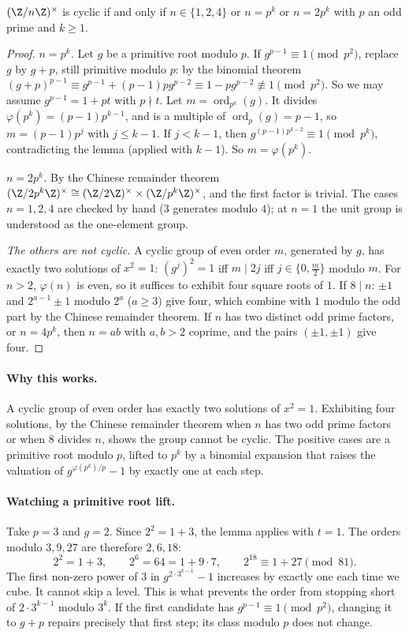 \begin{theorem}\label{thm:cyclicn}
$(\Z/n\Z)^\times$ is cyclic if and only if $n\in\{1,2,4\}$ or $n=p^k$ or $n=2p^k$ with $p$ an odd prime and $k\ge1$.
\end{theorem}
\begin{proof}
\emph{$n=p^k$.} Let $g$ be a primitive root modulo $p$. If $g^{p-1}\equiv1\pmod{p^2}$, replace $g$ by $g+p$, still primitive modulo $p$: by the binomial theorem $(g+p)^{p-1}\equiv g^{p-1}+(p-1)pg^{p-2}\equiv1-pg^{p-2}\not\equiv1\pmod{p^2}$. So we may assume $g^{p-1}=1+pt$ with $p\nmid t$. Let $m=\operatorname{ord}_{p^k}(g)$. It divides $\varphi(p^k)=(p-1)p^{k-1}$, and is a multiple of $\operatorname{ord}_p(g)=p-1$, so $m=(p-1)p^j$ with $j\le k-1$. If $j<k-1$, then $g^{(p-1)p^{k-2}}\equiv1\pmod{p^k}$, contradicting the lemma (applied with $k-1$). So $m=\varphi(p^k)$.

\emph{$n=2p^k$.} By the Chinese remainder theorem $(\Z/2p^k\Z)^\times\cong(\Z/2\Z)^\times\times(\Z/p^k\Z)^\times$, and the first factor is trivial. The cases $n=1,2,4$ are checked by hand ($3$ generates modulo $4$); at $n=1$ the unit group is understood as the one-element group.

\emph{The others are not cyclic.} A cyclic group of even order $m$, generated by $g$, has exactly two solutions of $x^2=1$: $(g^j)^2=1$ iff $m\mid2j$ iff $j\in\{0,\frac m2\}$ modulo $m$. For $n>2$, $\varphi(n)$ is even, so it suffices to exhibit four square roots of $1$. If $8\mid n$: $\pm1$ and $2^{a-1}\pm1$ modulo $2^a$ ($a\ge3$) give four, which combine with $1$ modulo the odd part by the Chinese remainder theorem. If $n$ has two distinct odd prime factors, or $n=4p^k$, then $n=ab$ with $a,b>2$ coprime, and the pairs $(\pm1,\pm1)$ give four.
\end{proof}

\paragraph{Why this works.}
A cyclic group of even order has exactly two solutions of $x^2=1$. Exhibiting four solutions, by the Chinese remainder theorem when $n$ has two odd prime factors or when $8$ divides $n$, shows the group cannot be cyclic. The positive cases are a primitive root modulo $p$, lifted to $p^k$ by a binomial expansion that raises the valuation of $g^{\varphi(p^k)/p}-1$ by exactly one at each step.

\paragraph{Watching a primitive root lift.}
Take $p=3$ and $g=2$. Since $2^2=1+3$, the lemma applies with $t=1$.
The orders modulo $3,9,27$ are therefore $2,6,18$:
\[
 2^2=1+3,\qquad 2^6=64=1+9\cdot7,
 \qquad 2^{18}\equiv1+27\pmod{81}.
\]
The first non-zero power of $3$ in $g^{2\cdot3^{k-1}}-1$ increases by
exactly one each time we cube. It cannot skip a level. This is what prevents
the order from stopping short of $2\cdot3^{k-1}$ modulo $3^k$.
If the first candidate has $g^{p-1}\equiv1\pmod{p^2}$, changing it to
$g+p$ repairs precisely that first step; its class modulo $p$ does not change.

